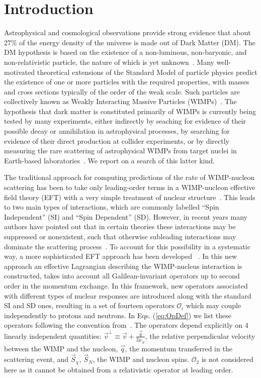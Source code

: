 \section{Introduction}

Astrophysical and cosmological observations provide strong evidence that about 27\% of the energy density of the universe is made out of Dark Matter (DM). 
The DM hypothesis is based on the existence of a non-luminous, non-baryonic, and non-relativistic particle, the nature of which 
is yet unknown~\cite{Harvey1462,WMAP:9years,PLANCK}. 
Many well-motivated theoretical extensions of the Standard Model of particle physics predict the existence of one or more particles with the required properties, with masses and cross sections typically of the order of the weak scale. Such particles are collectively known as Weakly Interacting Massive Particles (WIMPs)~\cite{Bertone:2010zza}. The hypothesis that dark matter is constituted primarily of WIMPs is currently being tested by many experiments, either indirectly by seaching for evidence of their possible decay or annihilation in astrophysical processes, by searching for evidence of their direct production at collider experiments, or by directly measuring the rare scattering of astrophysical WIMPs from target nuclei in Earth-based laboratories~\cite{xe100_run_combination,PANDAX,LUXnew,COGENT,CDMSlite,CREST,DAMA}. We report on a search of this latter kind.


The traditional approach for computing predictions of the rate of WIMP-nucleon scattering has been to take only leading-order terms in a WIMP-nucleon effective field theory (EFT) with a very simple treatment of nuclear structure~\cite{LEWIN}. This leads to two main types of interactions, which are commonly labelled ``Spin Independent'' (SI) and ``Spin Dependent'' (SD). However, in recent years many authors have pointed out that in certain theories these interactions may be suppressed or nonexistent, such that otherwise subleading interactions may dominate the scattering process~\cite{Chang:2009yt}. To account for this possibility in a systematic way, a more sophisticated EFT approach has been developed ~\cite{Fitzpatrick:2012ib,Anand:MathTools,Fitzpatrick:MathTools}. In this new approach an effective Lagrangian describing the WIMP-nucleus interaction is constructed, 
 takes into account all Galilean-invariant operators up to second order in the momentum exchange. In this framework, new operators associated with different types of nuclear responses are introduced along with the standard SI and SD ones, resulting in a set of fourteen operators $\mathcal{O}_i$ which may couple independently to protons and neutrons. In Eqs. (\ref{eq:OpDef}) we list these operators following the convention from~\cite{Anand:MathTools}. The operators depend explicitly on 4 linearly independent quantities: $\vec{v}^{\perp} \equiv \vec{v} + \frac{\vec{q}}{2\mu_N} $, the relative perpendicular velocity between the WIMP and the nucleon, $\vec{q}$, the momentum transferred in the scattering event, and $\vec{S}_\chi$, $\vec{S}_N$, the WIMP and nucleon spins. $\mathcal{O}_2$ is not considered here as it cannot be obtained from a relativistic operator at leading order.
%

